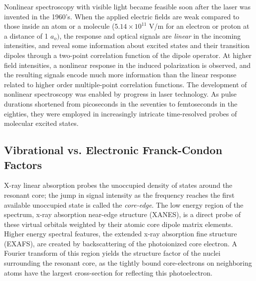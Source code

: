 \documentclass{ar-1col}
\begin{document}
Nonlinear spectroscopy with visible light became feasible soon after
the laser was invented in the 1960's.  When the applied electric
fields are weak compared to those inside an atom or a molecule
($5.14\times 10^{11}$ V/m for an electron or proton
at a distance of 1 $a_o)$, the response and optical
signals are \emph{linear} in the incoming intensities, and reveal some
information about excited states and their transition dipoles through
a two-point correlation function of the dipole operator. At higher field intensities,
a nonlinear response in the induced polarization is
observed, and the resulting signals encode much more information than
the linear response related to higher order multiple-point correlation
functions.\cite{bloembergen_nonlinear_1982,zewail_femtochemistry:_2000}
The development of nonlinear spectroscopy was enabled by progress in laser technology. As pulse durations shortened from picoseconds in
the seventies to femtoseconds in the eighties, they were employed in
increasingly intricate time-resolved probes of molecular excited
states.%

\begin{marginnote}
\end{marginnote}


\subsection{Vibrational vs. Electronic Franck-Condon Factors}
X-ray linear
absorption\cite{Stohr1996,groot_core_2008,santra_concepts_2009} probes
the unoccupied density of states around the resonant core; the jump in
signal intensity as the frequency reaches the first available
unoccupied state is called the \emph{core-edge}.  The low energy
region of the spectrum, x-ray absorption near-edge structure (XANES),
is a direct probe of these virtual orbitals weighted by their atomic
core dipole matrix elements.  Higher energy spectral features, the
extended x-ray absorption fine structure (EXAFS), are created by
backscattering of the photoionized core electron.  A Fourier transform of
this region yields the structure factor of the nuclei surrounding the
resonant
core,\cite{chen_capturing_2001,rehr_theoretical_2000,bressler_ultrafast_2004}
as the tightly bound core-electrons on neighboring atoms have the
largest cross-section for reflecting this photoelectron.%
\end{document}
